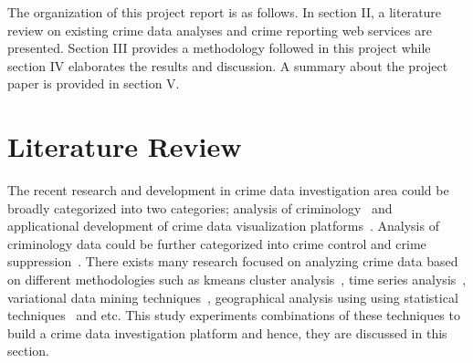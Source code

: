 The organization of this project report is as follows. In section II,
a literature review on existing crime data analyses and crime
reporting web services are presented. Section III provides a
methodology followed in this project while section IV elaborates the
results and discussion. A summary about the project paper is provided
in section V.

\section{Literature Review}
The recent research and development in crime data investigation area
could be broadly categorized into two categories; analysis of
criminology~\cite{hid-sp18-409-agarwal2013crime,
hid-sp18-409-bharathi2014survey, hid-sp18-409-kiani2015analysis,
hid-sp18-409-nath2006crime, hid-sp18-409-gera2014city} and
applicational development of crime data visualization
platforms~\cite{hid-sp18-409-www-spotcrime,
hid-sp18-409-www-crimereports, hid-sp18-409-www-mylocalcrime,
hid-sp18-409-www-crimemapping}. Analysis of criminology data could be
further categorized into crime control and crime
suppression~\cite{hid-sp18-409-agarwal2013crime}. There exists many
research focused on analyzing crime data based on different
methodologies such as kmeans cluster
analysis~\cite{hid-sp18-409-gera2014city, hid-sp18-409-nath2006crime,
hid-sp18-409-agarwal2013crime}, time series
analysis~\cite{hid-sp18-409-wei2006time}, variational data mining
techniques~\cite{hid-sp18-409-chen2004crime}, geographical analysis
using using statistical techniques~\cite{hid-sp18-409-santos2016crime}
and etc. This study experiments combinations of these techniques to
build a crime data investigation platform and hence, they are
discussed in this section.


